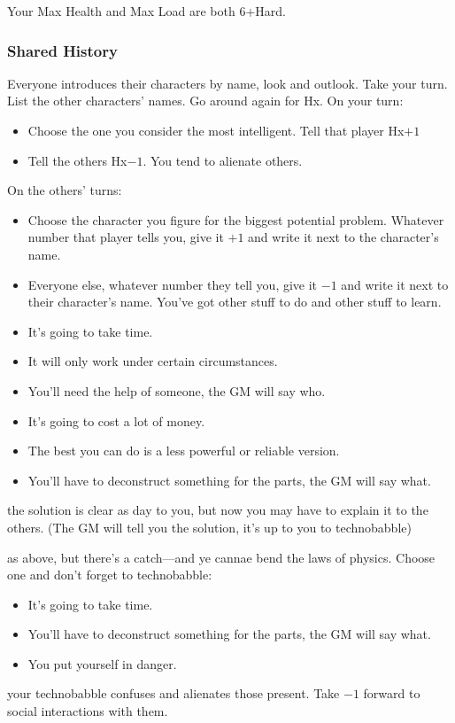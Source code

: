 Your Max Health and Max Load are both 6+Hard.

\subsubsection{Shared History}
Everyone introduces their characters by name, look and outlook. Take
your turn. List the other characters' names. Go around again for
Hx. On your turn:
\begin{itemize} %
\item Choose the one you consider the most intelligent. Tell that player Hx$+1$
\item Tell the others Hx$-1$. You tend to alienate others.
\end{itemize}
On the others’ turns:
\begin{itemize} %
\item Choose the character you figure for the biggest potential
  problem. Whatever number that player tells you, give it $+1$ and write
  it next to the character’s name.
\item Everyone else, whatever number they tell you, give it $-1$ and
  write it next to their character’s name. You’ve got other stuff to
  do and other stuff to learn.
\end{itemize}

\begin{itemize}
\item It's going to take time.
\item It will only work under certain circumstances.
\item You'll need the help of someone, the GM will say who.
\item It's going to cost a lot of money.
\item The best you can do is a less powerful or reliable version.
\item You’ll have to deconstruct something for the parts, the GM will say what.
\end{itemize}

{the solution is clear as day to you, but now you may have to explain it to the others. (The GM will tell you the solution, it's up to you to technobabble)}
{as above, but there's a catch---and ye cannae bend the laws of physics. Choose one and don't forget to technobabble:
\begin{itemize}
\item It's going to take time.
\item You’ll have to deconstruct something for the parts, the GM will say what.
\item You put yourself in danger.
\end{itemize}}
{your technobabble confuses and alienates those present. Take $-1$ forward to social interactions with them.}

